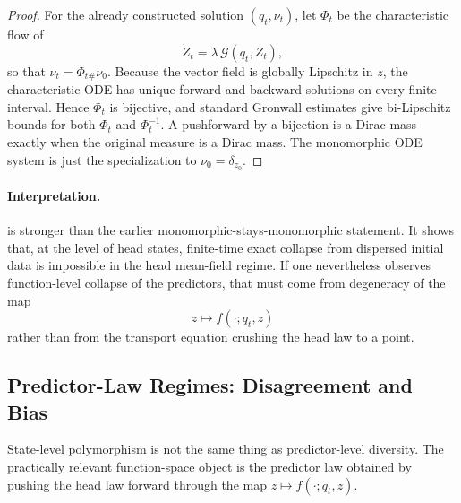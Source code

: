 \documentclass{article}
\theoremstyle{definition}
\begin{document}
\begin{proof}
For the already constructed solution $(q_t,\nu_t)$, let $\Phi_t$ be the characteristic flow of
\[
  \dot Z_t = \lambda\,\mathcal G(q_t,Z_t),
\]
so that $\nu_t=\Phi_{t\#}\nu_0$. Because the vector field is globally Lipschitz in $z$, the characteristic ODE has unique forward and backward solutions on every finite interval. Hence $\Phi_t$ is bijective, and standard Gronwall estimates give bi-Lipschitz bounds for both $\Phi_t$ and $\Phi_t^{-1}$. A pushforward by a bijection is a Dirac mass exactly when the original measure is a Dirac mass. The monomorphic ODE system is just the specialization to $\nu_0=\delta_{z_0}$.
\end{proof}

\paragraph{Interpretation.}
 is stronger than the earlier monomorphic-stays-monomorphic statement. It shows that, at the level of head states, finite-time exact collapse from dispersed initial data is impossible in the head mean-field regime. If one nevertheless observes function-level collapse of the predictors, that must come from degeneracy of the map
\[
  z \mapsto f(\cdot;q_t,z)
\]
rather than from the transport equation crushing the head law to a point.

\subsection{Predictor-Law Regimes: Disagreement and Bias}

State-level polymorphism is not the same thing as predictor-level diversity. The
practically relevant function-space object is the predictor law obtained by pushing the head law
forward through the map $z\mapsto f(\cdot;q_t,z)$.
\end{document}
